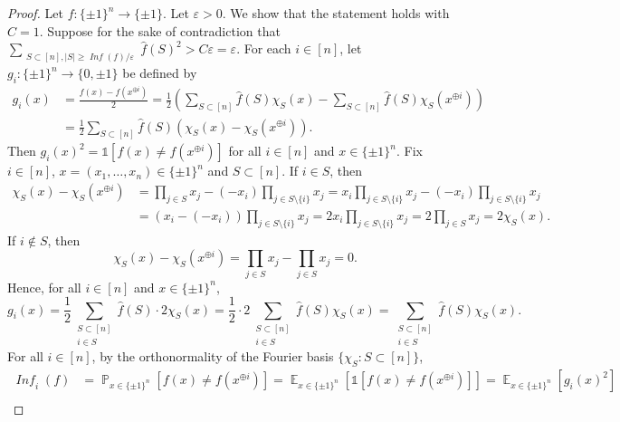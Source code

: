 \documentclass[letterpaper, reqno,11pt]{article}
\newcommand{\PP}{\mathop{{}\mathbb{P}}}
\newcommand{\EE}{\mathop{{}\mathbb{E}}}
\DeclareMathOperator{\Inf}{\mathit{Inf}}
\begin{document}
\begin{enumerate}
\begin{enumerate}
    \begin{proof}
      Let $f : \{ \pm 1 \}^n \to \{ \pm 1 \}$. Let $\varepsilon > 0$. We show that the statement holds with $C = 1$. Suppose for the sake of contradiction that $\sum_{\substack{S \subset [n], |S| \geq \Inf(f) / \varepsilon}} \hat{f}(S)^2 > C \varepsilon = \varepsilon$.
      For each $i \in [n]$, let $g_i : \{ \pm 1 \}^n \to \{ 0, \pm 1 \}$ be defined by
      \begin{align*}
        g_i(x) &= \frac{f(x) - f\left(x^{\oplus i}\right)}{2} = \frac{1}{2} \left(\sum_{S \subset [n]} \hat{f}(S) \chi_S(x) - \sum_{S \subset [n]} \hat{f}(S) \chi_S\left(x^{\oplus i}\right)\right) \\
        &= \frac{1}{2} \sum_{S \subset [n]} \hat{f}(S) \left(\chi_S(x) - \chi_S\left(x^{\oplus i}\right)\right).
      \end{align*}
      Then $g_i(x)^2 = \mathds 1[f(x) \neq f(x^{\oplus i})]$ for all $i \in [n]$ and $x \in \{ \pm 1 \}^n$. Fix $i \in [n]$, $x = (x_1, \ldots, x_n) \in \{ \pm 1 \}^n$ and $S \subset [n]$. If $i \in S$, then
      \begin{align*}
        \chi_S(x) - \chi_S\left(x^{\oplus i}\right) &= \prod_{j \in S} x_j - \left(-x_i\right) \prod_{j \in S \setminus \{ i \}} x_j = x_i \prod_{j \in S \setminus \{ i \}} x_j - \left(-x_i\right) \prod_{j \in S \setminus \{ i \}} x_j \\
        &= \left(x_i - \left(-x_i\right)\right) \prod_{j \in S \setminus \{ i \}} x_j = 2x_i \prod_{j \in S \setminus \{ i \}} x_j = 2\prod_{j \in S} x_j = 2\chi_S(x).
      \end{align*}
      If $i \not \in S$, then
      $$ \chi_S(x) - \chi_S\left(x^{\oplus i}\right) = \prod_{j \in S} x_j - \prod_{j \in S} x_j = 0. $$
      Hence, for all $i \in [n]$ and $x \in \{ \pm 1 \}^n$,
      $$ g_i(x) = \frac{1}{2} \sum_{\substack{S \subset [n] \\ i \in S}} \hat{f}(S) \cdot 2\chi_S(x) = \frac{1}{2} \cdot 2 \sum_{\substack{S \subset [n] \\ i \in S}} \hat{f}(S) \chi_S(x) = \sum_{\substack{S \subset [n] \\ i \in S}} \hat{f}(S) \chi_S(x). $$
      For all $i \in [n]$, by the orthonormality of the Fourier basis $\{ \chi_S : S \subset [n] \}$,
      \begin{align*}
        \Inf_i(f) &= \PP_{x \in \{ \pm 1 \}^n}\left[f(x) \neq f\left(x^{\oplus i}\right)\right] = \EE_{x \in \{ \pm 1 \}^n}\left[\mathds 1\left[f(x) \neq f\left(x^{\oplus i}\right)\right]\right] = \EE_{x \in \{ \pm 1 \}^n}\left[g_i(x)^2\right] \\

\end{align*}
\end{proof}
\end{enumerate}
\end{enumerate}
\end{document}
